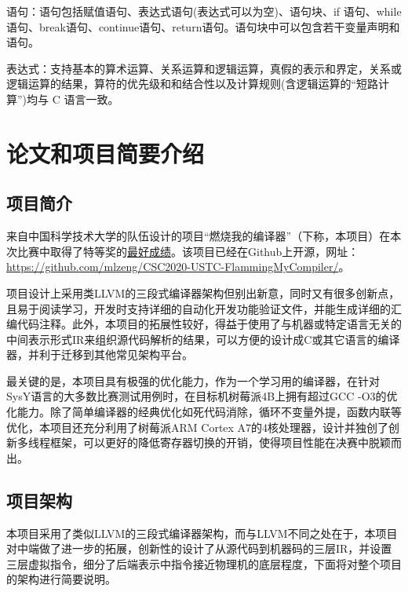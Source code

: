 语句：语句包括赋值语句、表达式语句(表达式可以为空)、语句块、if 语句、while 语句、break语句、continue语句、return语句。语句块中可以包含若干变量声明和语句。

表达式：支持基本的算术运算、关系运算和逻辑运算，真假的表示和界定，关系或逻辑运算的结果，算符的优先级和和结合性以及计算规则(含逻辑运算的“短路计算”)均与 C 语言一致。

\section{论文和项目简要介绍}

\subsection{项目简介}

来自中国科学技术大学的队伍设计的项目“燃烧我的编译器”（下称，本项目）在本次比赛中取得了特等奖的\href{https://compiler.educg.net/2020CSDC}{最好成绩}。该项目已经在Github上开源，网址：\href{https://github.com/mlzeng/CSC2020-USTC-FlammingMyCompiler/}{https://github.com/mlzeng/CSC2020-USTC-FlammingMyCompiler/}。

项目设计上采用类LLVM的三段式编译器架构但别出新意，同时又有很多创新点，且易于阅读学习，开发时支持详细的自动化开发功能验证文件，并能生成详细的汇编代码注释。此外，本项目的拓展性较好，得益于使用了与机器或特定语言无关的中间表示形式IR来组织源代码解析的结果，可以方便的设计成C或其它语言的编译器，并利于迁移到其他常见架构平台。

最关键的是，本项目具有极强的优化能力，作为一个学习用的编译器，在针对SysY语言的大多数比赛测试用例时，在目标机树莓派4B上拥有超过GCC -O3的优化能力。除了简单编译器的经典优化如死代码消除，循环不变量外提，函数内联等优化，本项目还充分利用了树莓派ARM Cortex A7的4核处理器，设计并独创了创新多线程框架，可以更好的降低寄存器切换的开销，使得项目性能在决赛中脱颖而出。

\subsection{项目架构}

本项目采用了类似LLVM的三段式编译器架构，而与LLVM不同之处在于，本项目对中端做了进一步的拓展，创新性的设计了从源代码到机器码的三层IR，并设置三层虚拟指令，细分了后端表示中指令接近物理机的底层程度，下面将对整个项目的架构进行简要说明。

